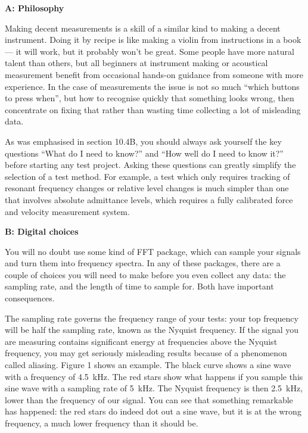   \textbf{A: Philosophy} 

  Making decent measurements is a skill of a similar kind to making a decent 
  instrument. Doing it by recipe is like making a violin from instructions in a 
  book — it will work, but it probably won’t be great. Some people have more 
  natural talent than others, but all beginners at instrument making or 
  acoustical measurement benefit from occasional hands-on guidance from someone 
  with more experience. In the case of measurements the issue is not so much 
  “which buttons to press when”, but how to recognise quickly that something 
  looks wrong, then concentrate on fixing that rather than wasting time 
  collecting a lot of misleading data. 

  As was emphasised in section 10.4B, you should always ask yourself the key 
  questions “What do I need to know?” and “How well do I need to know it?” 
  before starting any test project. Asking these questions can greatly simplify 
  the selection of a test method. For example, a test which only requires 
  tracking of resonant frequency changes or relative level changes is much 
  simpler than one that involves absolute admittance levels, which requires a 
  fully calibrated force and velocity measurement system. 

  \textbf{B: Digital choices} 

  You will no doubt use some kind of FFT package, which can sample your signals 
  and turn them into frequency spectra. In any of these packages, there are a 
  couple of choices you will need to make before you even collect any data: the 
  sampling rate, and the length of time to sample for. Both have important 
  consequences. 

  The sampling rate governs the frequency range of your tests: your top 
  frequency will be half the sampling rate, known as the Nyquist frequency. If 
  the signal you are measuring contains significant energy at frequencies above 
  the Nyquist frequency, you may get seriously misleading results because of a 
  phenomenon called aliasing. Figure 1 shows an example. The black curve shows 
  a sine wave with a frequency of 4.5~kHz. The red stars show what happens if 
  you sample this sine wave with a sampling rate of 5~kHz. The Nyquist 
  frequency is then 2.5~kHz, lower than the frequency of our signal. You can 
  see that something remarkable has happened: the red stars do indeed dot out a 
  sine wave, but it is at the wrong frequency, a much lower frequency than it 
  should be. 

